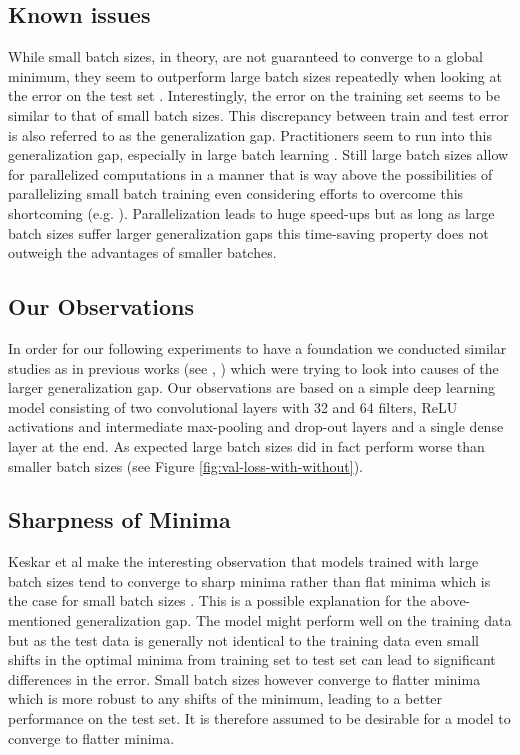 \documentclass[10pt,conference,compsocconf]{IEEEtran}
\begin{document}
\subsection{Known issues}
\label{subsec:known-issues}

While small batch sizes, in theory, are not guaranteed to converge to a global minimum, they seem to outperform large batch sizes repeatedly when looking at the error on the test set \cite{keskar2017largebatch}. Interestingly, the error on the training set seems to be similar to that of small batch sizes. This discrepancy between train and test error is also referred to as the generalization gap. Practitioners seem to run into this generalization gap, especially in large batch learning \cite{lecunEfficientBackProp2012}. Still large batch sizes allow for parallelized computations in a manner that is way above the possibilities of parallelizing small batch training even considering efforts to overcome this shortcoming (e.g. \cite{dasDistributedDeepLearning2016}). Parallelization leads to huge speed-ups but as long as large batch sizes suffer larger generalization gaps this time-saving property does not outweigh the advantages of smaller batches.

\subsection{Our Observations}
\label{subsec:our-observations}

In order for our following experiments to have a foundation we conducted similar studies as in previous works (see \cite{changEffectBatchSize2020}, \cite{shenEffectBatchSize2018}) which were trying to look into causes of the larger generalization gap. Our observations are based on a simple deep learning model consisting of two convolutional layers with 32 and 64 filters, ReLU activations and intermediate max-pooling and drop-out layers and a single dense layer at the end. As expected large batch sizes did in fact perform worse than smaller batch sizes (see Figure \ref{fig:val-loss-with-without}).

\subsection{Sharpness of Minima}
\label{subsec:sharpness}

Keskar et al make the interesting observation that models trained with large batch sizes tend to converge to sharp minima rather than flat minima which is the case for small batch sizes \cite{keskar2017largebatch}. This is a possible explanation for the above-mentioned generalization gap. The model might perform well on the training data but as the test data is generally not identical to the training data even small shifts in the optimal minima from training set to test set can lead to significant differences in the error. Small batch sizes however converge to flatter minima which is more robust to any shifts of the minimum, leading to a better performance on the test set. It is therefore assumed to be desirable for a model to converge to flatter minima.
\end{document}
